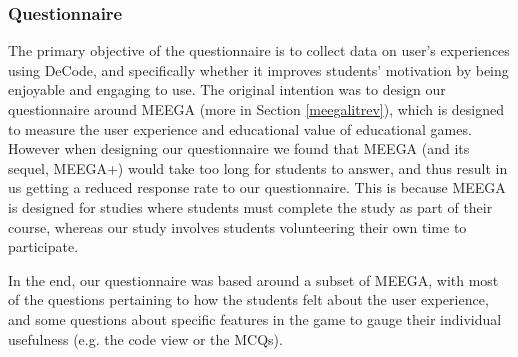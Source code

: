 \documentclass[11pt]{article}
\begin{document}
\subsubsection{Questionnaire}
The primary objective of the questionnaire is to collect data on user's experiences using DeCode, and specifically whether it improves students' motivation by being enjoyable and engaging to use. The original intention was to design our questionnaire around MEEGA\cite{Rafael}\cite{meegaPlus} (more in Section \ref{meegalitrev}), which is designed to measure the user experience and educational value of educational games. However when designing our questionnaire we found that MEEGA (and its sequel, MEEGA+) would take too long for students to answer, and thus result in us getting a reduced response rate to our questionnaire. This is because MEEGA is designed for studies where students must complete the study as part of their course, whereas our study involves students volunteering their own time to participate.\par
In the end, our questionnaire was based around a subset of MEEGA, with most of the questions pertaining to how the students felt about the user experience, and some questions about specific features in the game to gauge their individual usefulness (e.g. the code view or the MCQs).
\end{document}
